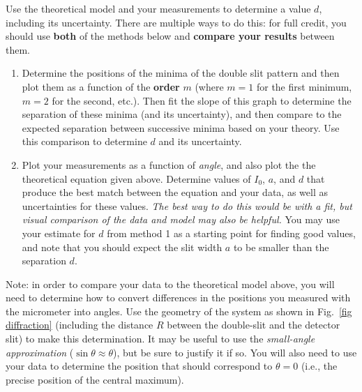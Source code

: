 \documentclass[11pt]{article}
\begin{document}
Use the theoretical model and your measurements to determine a value $d$, including its uncertainty. There are multiple ways to do this: for full credit, you should use \textbf{both} of the methods below and \textbf{compare your results} between them.
\begin{enumerate}
  \item Determine the positions of the minima of the double slit pattern and then plot them as a function of the \textbf{order} $m$ (where $m=1$ for the first minimum, $m=2$ for the second, etc.). Then fit the slope of this graph to determine the separation of these minima (and its uncertainty), and then compare to the expected separation between successive minima based on your theory. Use this comparison to determine $d$ and its uncertainty.
  \item Plot your measurements as a function of \textit{angle}, and also plot the the theoretical
  equation given above. Determine values of $I_0$, $a$, and $d$ that produce the best 
  match between the equation and your data, as well as uncertainties for these values. 
  \textit{The best way to do this would be with a fit, but visual comparison of the data 
  and model may also be helpful.} You may use your estimate for $d$ from method 1 as 
  a starting point for finding good values, and note that you should expect the slit width 
  $a$ to be smaller than the separation $d$.
\end{enumerate}

Note: in order to compare your data to the theoretical model above, you will need to
determine how to convert differences in the positions you measured with the micrometer
into angles. Use the geometry of the system as shown in Fig.~\ref{fig diffraction}
(including the
distance $R$ between the double-slit and the detector slit) to make this determination. It 
may be useful to use the \textit{small-angle approximation} ($\sin\theta\approx\theta$), but be sure to justify it if so. You will also need to use your data to determine the position that should correspond to $\theta=0$ (i.e., the precise position of the central maximum).

\end{document}
